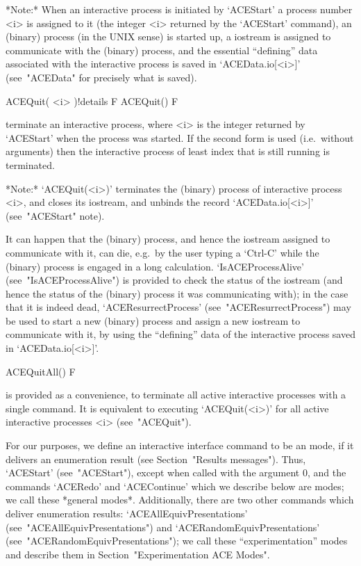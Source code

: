 *Note:*
When an interactive  {\ACE}  process  is  initiated  by  `ACEStart'  a
process number <i> is assigned to it (the integer <i> returned by  the
`ACEStart' command), an {\ACE} (binary) process (in the UNIX sense) is
started up, a {\GAP} iostream is  assigned  to  communicate  with  the
{\ACE}  (binary)  process,  and  the   essential   ``defining''   data
associated  with  the  interactive  {\ACE}   process   is   saved   in
`ACEData.io[<i>]' (see~"ACEData" for precisely what is saved).

\>ACEQuit( <i> )!{details} F
\>ACEQuit() F

terminate an interactive {\ACE} process,  where  <i>  is  the  integer
returned by `ACEStart' when the process was  started.  If  the  second
form is used (i.e.~without arguments) then the interactive process  of
least index that is still running is terminated.

*Note:*
`ACEQuit(<i>)' terminates the {\ACE} (binary) process  of  interactive
{\ACE} process <i>, and closes its {\GAP} iostream,  and  unbinds  the
record `ACEData.io[<i>]' (see~"ACEStart" note).

It can happen that the {\ACE} (binary) process, and hence  the  {\GAP}
iostream assigned to communicate with it, can die,  e.g.~by  the  user
typing a `Ctrl-C' while the {\ACE} (binary) process is  engaged  in  a
long  calculation.  `IsACEProcessAlive'  (see~"IsACEProcessAlive")  is
provided to check the status of the {\GAP}  iostream  (and  hence  the
status of the {\ACE} (binary) process it was communicating  with);  in
the   case   that   it   is   indeed    dead,    `ACEResurrectProcess'
(see~"ACEResurrectProcess") may be used to start a new {\ACE} (binary)
process and assign a new {\GAP} iostream to communicate  with  it,  by
using the ``defining'' data of the interactive {\ACE} process saved in
`ACEData.io[<i>]'.

\>ACEQuitAll() F

is provided as a convenience,  to  terminate  all  active  interactive
{\ACE} processes with a single command. It is equivalent to  executing
`ACEQuit(<i>)'  for  all  active  interactive  {\ACE}  processes   <i>
(see~"ACEQuit").


For our purposes, we define an interactive {\ACE} interface command to
be  an  {\ACE}  mode,  if  it  delivers  an  enumeration  result  (see
Section~"Results messages"). Thus, `ACEStart' (see~"ACEStart"), except
when called with the  argument  0,  and  the  commands  `ACERedo'  and
`ACEContinue' which we describe below are {\ACE} modes; we call  these
*general {\ACE} modes*. Additionally, there  are  two  other  commands
which   deliver   enumeration   results:    `ACEAllEquivPresentations'
(see~"ACEAllEquivPresentations")   and   `ACERandomEquivPresentations'
(see~"ACERandomEquivPresentations"); we call these ``experimentation''
{\ACE} modes and describe them in Section~"Experimentation ACE Modes".

